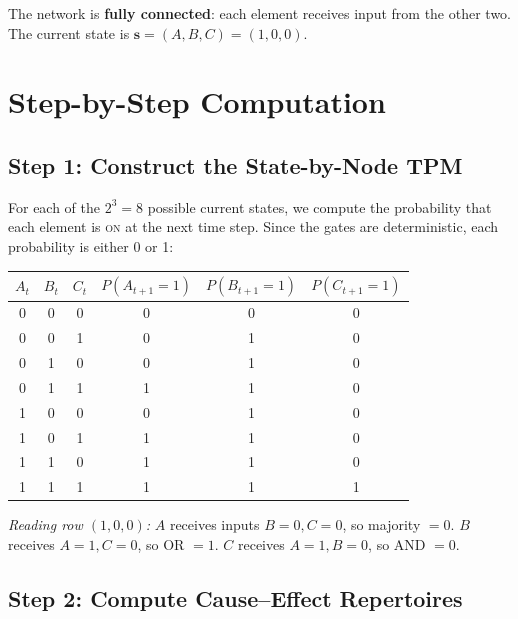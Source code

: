 \documentclass[11pt,a4paper]{report}
\begin{document}
The network is \textbf{fully connected}: each element receives input from the other two. The current state is $\mathbf{s} = (A, B, C) = (1, 0, 0)$.

\section{Step-by-Step Computation}

\subsection{Step 1: Construct the State-by-Node TPM}

For each of the $2^3 = 8$ possible current states, we compute the probability that each element is \textsc{on} at the next time step. Since the gates are deterministic, each probability is either 0 or 1:

\begin{center}
\renewcommand{\arraystretch}{1.2}
\begin{tabular}{ccc|ccc}
  \toprule
  $A_t$ & $B_t$ & $C_t$ & $P(A_{t+1}{=}1)$ & $P(B_{t+1}{=}1)$ & $P(C_{t+1}{=}1)$ \\
  \midrule
  0 & 0 & 0 & 0 & 0 & 0 \\
  0 & 0 & 1 & 0 & 1 & 0 \\
  0 & 1 & 0 & 0 & 1 & 0 \\
  0 & 1 & 1 & 1 & 1 & 0 \\
  1 & 0 & 0 & 0 & 1 & 0 \\
  1 & 0 & 1 & 1 & 1 & 0 \\
  1 & 1 & 0 & 1 & 1 & 0 \\
  1 & 1 & 1 & 1 & 1 & 1 \\
  \bottomrule
\end{tabular}
\end{center}

\textit{Reading row $(1,0,0)$:} $A$ receives inputs $B{=}0, C{=}0$, so majority $= 0$. $B$ receives $A{=}1, C{=}0$, so OR $= 1$. $C$ receives $A{=}1, B{=}0$, so AND $= 0$.

\subsection{Step 2: Compute Cause--Effect Repertoires}
\end{document}
